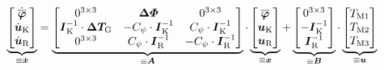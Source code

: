 \begin{equation}
\underbrace{\begin{bmatrix} \dot{\boldsymbol{\overline{\varphi}}} \\ \dot{\boldsymbol{u}}_{\text{K}} \\ \dot{\boldsymbol{u}}_{\text{R}} \end{bmatrix}}_{\equiv \dot{\boldsymbol{x}}} 
= 
\underbrace{\begin{bmatrix}
0^{3\times 3} & \boldsymbol{\Delta\varPhi} & 0^{3\times 3} \\
\boldsymbol{I}^{-1}_{\text{K}} \cdot \boldsymbol{\Delta T_{\text{G}}} & -C_{\psi}\cdot \boldsymbol{I}^{-1}_{\text{K}} & C_{\psi}\cdot \boldsymbol{I}^{-1}_{\text{K}} \\
0^{3\times 3} & C_{\psi}\cdot \boldsymbol{I}^{-1}_{\text{R}} & -C_{\psi}\cdot \boldsymbol{I}^{-1}_{\text{R}}
\end{bmatrix}}_{\equiv \boldsymbol{A}}
\cdot
\underbrace{\begin{bmatrix}\boldsymbol{\overline{\varphi}} \\ \boldsymbol{u}_{\text{K}} \\ \boldsymbol{u}_{\text{R}}\end{bmatrix}}_{\equiv \boldsymbol{x}}
+
\underbrace{\begin{bmatrix}
0^{3\times 3} \\ -\boldsymbol{I}^{-1}_{\text{K}} \\ \boldsymbol{I}^{-1}_{\text{R}}
\end{bmatrix}}_{\equiv \boldsymbol{B}}
\cdot
\underbrace{\begin{bmatrix}
T_{\text{M1}} \\ T_{\text{M2}} \\ T_{\text{M3}}
\end{bmatrix}}_{\equiv \boldsymbol{u}}
\end{equation}